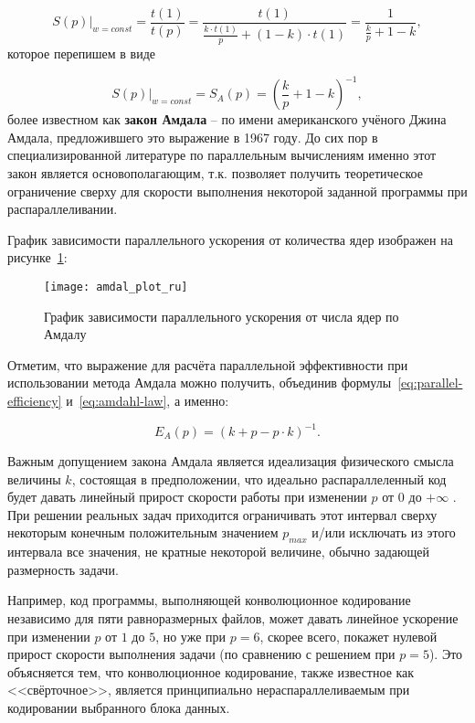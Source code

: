\begin{equation}
    \label{eq:amdahl-t-from-p-2}
    \left.S(p)\right|_{w = const} = \frac{t(1)}{t(p)} = \frac{t(1)}{{\displaystyle\frac{k \cdot t(1)}{p}} + (1 - k) \cdot t(1)} = \frac{1}{{\displaystyle\frac{k}{p}} + 1 - k},
\end{equation}
которое перепишем в виде

\begin{equation}
    \label{eq:amdahl-law}
    \left.S(p)\right|_{w=const} = S_A(p) = \left(\frac{k}{p} + 1 - k\right)^{-1},
\end{equation}
более известном как \textbf{закон Амдала} – по имени американского учёного Джина Амдала, предложившего это выражение в 1967 году. До сих пор в специализированной литературе по параллельным вычислениям именно этот закон является основополагающим, т.к. позволяет получить теоретическое ограничение сверху для скорости выполнения некоторой заданной программы при распараллеливании.

График зависимости параллельного ускорения от количества ядер изображен на рисунке~\ref{fig:amdahl-graph}:

\begin{figure}[H]
    \texttt{[image: amdal\_plot\_ru]}
    \caption{График зависимости параллельного ускорения от числа ядер по Амдалу}
    \label{fig:amdahl-graph}
\end{figure}

Отметим, что выражение для расчёта параллельной эффективности при использовании метода Амдала можно получить, объединив формулы~\eqref{eq:parallel-efficiency} и~\eqref{eq:amdahl-law}, а именно:

\begin{equation}
    \label{eq:amdahl-parallel-efficiency}
    E_A(p) = \left(k + p - p \cdot k\right)^{-1}.
\end{equation}

Важным допущением закона Амдала является идеализация физического смысла величины $k$, состоящая в предположении, что идеально распараллеленный код будет давать линейный прирост скорости работы при изменении $p$ от $0$ до $+\infty$ . При решении реальных задач приходится ограничивать этот интервал сверху некоторым конечным положительным значением $p_{max}$ и/или исключать из этого интервала все значения, не кратные некоторой величине, обычно задающей размерность задачи.

Например, код программы, выполняющей конволюционное кодирование независимо для пяти равноразмерных файлов, может давать линейное ускорение при изменении $p$ от $1$ до $5$, но уже при $p=6$, скорее всего, покажет нулевой прирост скорости выполнения задачи (по сравнению с решением при $p=5$). Это объясняется тем, что  конволюционное кодирование, также известное как <<свёрточное>>, является принципиально нераспараллеливаемым при кодировании выбранного блока данных.
